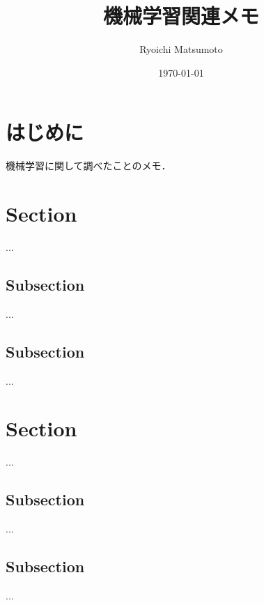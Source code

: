 \documentclass[11pt,a4paper]{jsarticle}
\title{機械学習関連メモ}
\author{Ryoichi Matsumoto}
\date{\today}
\begin{document}
\maketitle
%
%
\tableofcontents
\listoftables
\listoffigures
%
%

\section{はじめに}
機械学習に関して調べたことのメモ．

\section{Section}
...

\subsection{Subsection}
...

\subsection{Subsection}
...

\section{Section}
...

\subsection{Subsection}
...

\subsection{Subsection}
...

%
%
\end{document}

